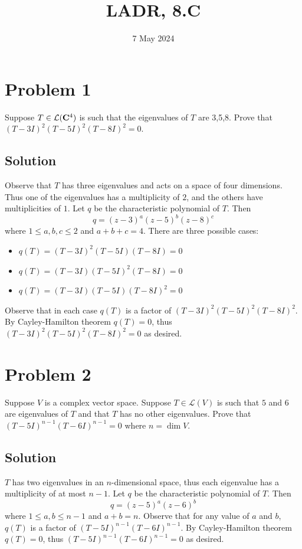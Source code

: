\documentclass{article}
\title{LADR, 8.C}
\date{7 May 2024}
\begin{document}
\maketitle

\section*{Problem 1}
Suppose $T\in\mathcal{L}(\mathbf{C}^4)$ is such that the eigenvalues of $T$ are 3,5,8. Prove that $(T-3I)^2(T-5I)^2(T-8I)^2=0$.

\subsection*{Solution}
Observe that $T$ has three eigenvalues and acts on a space of four dimensions. Thus one of the eigenvalues has a multiplicity of $2$, and the others have multiplicities of $1$. Let $q$ be the characteristic polynomial of $T$. Then
\[q=(z-3)^a(z-5)^b(z-8)^c\]
where $1\leq a,b,c\leq 2$ and $a+b+c=4$. There are three possible cases:
\begin{itemize}
    \item $q(T)=(T-3I)^2(T-5I)(T-8I)=0$
    \item $q(T)=(T-3I)(T-5I)^2(T-8I)=0$
    \item $q(T)=(T-3I)(T-5I)(T-8I)^2=0$
\end{itemize}

Observe that in each case $q(T)$ is a factor of $(T-3I)^2(T-5I)^2(T-8I)^2$. By Cayley-Hamilton theorem $q(T)=0$, thus $(T-3I)^2(T-5I)^2(T-8I)^2=0$ as desired.

\section*{Problem 2}
Suppose $V$ is a complex vector space. Suppose $T\in\mathcal{L}(V)$ is such that $5$ and $6$ are eigenvalues of $T$ and that $T$ has no other eigenvalues. Prove that $(T-5I)^{n-1}(T-6I)^{n-1}=0$ where $n=\dim V$.

\subsection*{Solution}
$T$ has two eigenvalues in an $n$-dimensional space, thus each eigenvalue has a multiplicity of at most $n-1$. Let $q$ be the characteristic polynomial of $T$. Then
\[q=(z-5)^a(z-6)^b\]
where $1\leq a,b\leq n-1$ and $a+b=n$. Observe that for any value of $a$ and $b$, $q(T)$ is a factor of $(T-5I)^{n-1}(T-6I)^{n-1}$. By Cayley-Hamilton theorem $q(T)=0$, thus $(T-5I)^{n-1}(T-6I)^{n-1}=0$ as desired.
\end{document}
